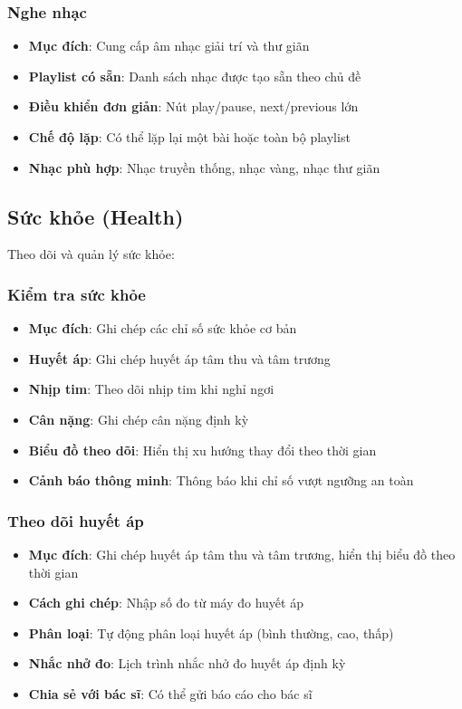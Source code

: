 \documentclass[12pt,a4paper]{article}
\begin{document}
\subsubsection{Nghe nhạc}
\begin{itemize}[leftmargin=2cm]
    \item \textbf{Mục đích}: Cung cấp âm nhạc giải trí và thư giãn
    \item \textbf{Playlist có sẵn}: Danh sách nhạc được tạo sẵn theo chủ đề
    \item \textbf{Điều khiển đơn giản}: Nút play/pause, next/previous lớn
    \item \textbf{Chế độ lặp}: Có thể lặp lại một bài hoặc toàn bộ playlist
    \item \textbf{Nhạc phù hợp}: Nhạc truyền thống, nhạc vàng, nhạc thư giãn
\end{itemize}

\subsection{Sức khỏe (Health)}
Theo dõi và quản lý sức khỏe:

\subsubsection{Kiểm tra sức khỏe}
\begin{itemize}[leftmargin=2cm]
    \item \textbf{Mục đích}: Ghi chép các chỉ số sức khỏe cơ bản
    \item \textbf{Huyết áp}: Ghi chép huyết áp tâm thu và tâm trương
    \item \textbf{Nhịp tim}: Theo dõi nhịp tim khi nghỉ ngơi
    \item \textbf{Cân nặng}: Ghi chép cân nặng định kỳ
    \item \textbf{Biểu đồ theo dõi}: Hiển thị xu hướng thay đổi theo thời gian
    \item \textbf{Cảnh báo thông minh}: Thông báo khi chỉ số vượt ngưỡng an toàn
\end{itemize}

\subsubsection{Theo dõi huyết áp}
\begin{itemize}[leftmargin=2cm]
    \item \textbf{Mục đích}: Ghi chép huyết áp tâm thu và tâm trương, hiển thị biểu đồ theo thời gian
    \item \textbf{Cách ghi chép}: Nhập số đo từ máy đo huyết áp
    \item \textbf{Phân loại}: Tự động phân loại huyết áp (bình thường, cao, thấp)
    \item \textbf{Nhắc nhở đo}: Lịch trình nhắc nhở đo huyết áp định kỳ
    \item \textbf{Chia sẻ với bác sĩ}: Có thể gửi báo cáo cho bác sĩ
\end{itemize}
\end{document}
